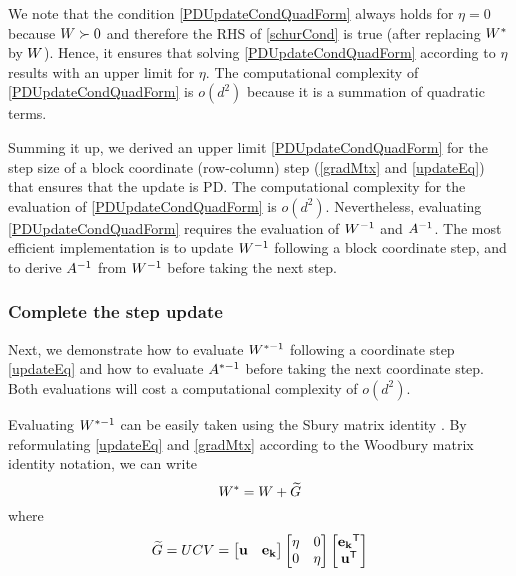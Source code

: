 \documentclass{article}
\begin{document}
We note that the condition \eqref{PDUpdateCondQuadForm} always holds
for $\eta = 0$ because ${W}\succ0$ and therefore the RHS of
\eqref{schurCond} is true (after replacing ${W}^*$ by ${W}$). Hence, it
ensures that solving \eqref{PDUpdateCondQuadForm} according to $\eta$
results with an upper limit for $\eta$.  The computational complexity
of \eqref{PDUpdateCondQuadForm} is $o(d^2)$ because it is a summation
of quadratic terms.

Summing it up, we derived an upper limit \eqref{PDUpdateCondQuadForm}
for the step size of a block coordinate (row-column) step
(\eqref{gradMtx} and \eqref{updateEq}) that ensures that the update is
PD. The computational complexity for the evaluation of
\eqref{PDUpdateCondQuadForm} is $o(d^2)$. Nevertheless, evaluating
\eqref{PDUpdateCondQuadForm} requires the evaluation of ${W}^{-1}$ and
${A}^{-1}$. The most efficient implementation is to update
${W}^{-1}$ following a block coordinate step, and to derive
${A}^{-1}$ from ${W}^{-1}$ before taking the next step.

\subsubsection{Complete the step update}

Next, we demonstrate how to evaluate ${W}^{*-1}$ following a coordinate
step \eqref{updateEq} and how to evaluate ${A}^{*-1}$ before
taking the next coordinate step. Both evaluations will cost a
computational complexity of $o(d^2)$.

Evaluating ${W}^{*-1}$ can be easily taken using the Sbury matrix
identity . By reformulating \eqref{updateEq} and
\eqref{gradMtx} according to the Woodbury matrix identity notation, we
can write
\begin{equation}
  {W^*} = {W}+{\widetilde{G}}
  \label{updateEqWDB}
\end{equation}
where
\begin{equation}
  {\widetilde{G}} = {U}{C}{V} = \left[ \begin{matrix}
  \mathbf{u} & \mathbf{e_k} \end{matrix} \right] \left[ \begin{matrix} \eta
  & 0 \\ 0 & \eta \end{matrix} \right] \left[ \begin{matrix}
  \mathbf{e_k}{}^\mathsf{T} \\ \mathbf{u}{}^\mathsf{T} \end{matrix} \right]
  \label{gradMtxWDB}
\end{equation}
\end{document}
